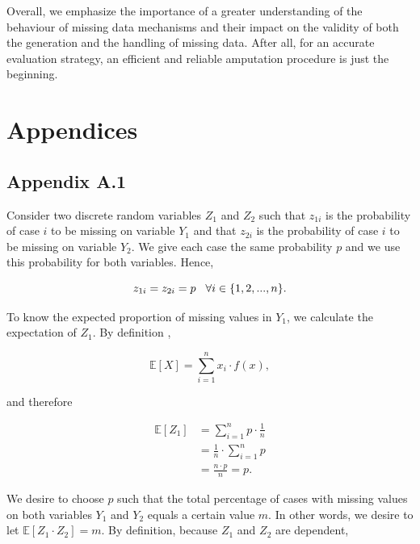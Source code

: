 \documentclass[11pt,a4paper]{article}
\begin{document}
Overall, we emphasize the importance of a greater understanding of the behaviour of missing data mechanisms and their impact on the validity of both the generation and the handling of missing data. After all, for an accurate evaluation strategy, an efficient and reliable amputation procedure is just the beginning. 

 


\normalsize \section*{Appendices}

\subsection*{Appendix A.1}

Consider two discrete random variables $Z_1$ and $Z_2$ such that $z_{1i}$ is the probability of case $i$ to be missing on variable $Y_1$ and that $z_{2i}$ is the probability of case $i$ to be missing on variable $Y_2$. We give each case the same probability $p$ and we use this probability for both variables. Hence, 

\begin{equation*}
z_{1i} = z_{2i} = p \hspace{3mm} \forall i \in \{1, 2, ..., n\}. 
\end{equation*}

\noindent To know the expected proportion of missing values in $Y_1$, we calculate the expectation of $Z_1$. By definition \citep{Freund},  

\begin{equation*}
\mathbb{E}[X] = \sum_{i = 1}^n x_i \cdot f(x),  
\end{equation*}

\noindent and therefore

\begin{align*}
\mathbb{E}[Z_1] &= \sum_{i = 1}^n p \cdot \frac{1}{n} \\
&= \frac{1}{n} \cdot \sum_{i = 1}^n p \\
&= \frac{n \cdot p}{n} = p.
\end{align*}

\noindent We desire to choose $p$ such that the total percentage of cases with missing values on both variables $Y_1$ and $Y_2$ equals a certain value $m$. In other words, we desire to let $\mathbb{E}[Z_1 \cdot Z_2] = m$. By definition, because $Z_1$ and $Z_2$ are dependent, 
\end{document}
